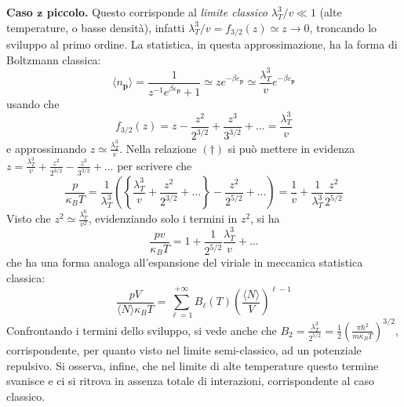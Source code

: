 \documentclass[11pt, a4paper]{scrartcl}
\theoremstyle{style}
\theoremstyle{style1}
\numberwithin{equation}{subsection}
\begin{document}
\textbf{Caso $\mathbf{z}$ piccolo.} Questo corrisponde al \textit{limite classico} $\lambda _T^3 / v \ll 1$ (alte temperature, o basse densit\`a), infatti $\lambda _T^3 / v=f_{3 / 2} (z) \simeq z \to 0$, troncando lo sviluppo al primo ordine.
La statistica, in questa approssimazione, ha la forma di Boltzmann classica:
\[
\langle n_\mathbf{p}  \rangle = \frac{1}{z^{-1}e^{\beta \varepsilon _\mathbf{p} }+1} \simeq z e^{-\beta \varepsilon _\mathbf{p} } \simeq \frac{\lambda _T^3}{v}e^{-\beta \varepsilon _\mathbf{p} }
\] 
usando che 
\begin{equation}
	f_{3 / 2} (z) = z - \frac{z^2}{2^{3 / 2}}+\frac{z^3}{3^{3 / 2}} + \ldots = \frac{\lambda _T^3}{v}
	\tag{$\dagger $}
\end{equation}
e approssimando $z\simeq \frac{\lambda _T^3}{v}$.
Nella relazione $(\dagger )$ si pu\`o mettere in evidenza $z = \frac{\lambda _T^3}{v} + \frac{z^2}{2^{3/2}} - \frac{z^3}{3^{3 / 2}}+\ldots$ per scrivere che
\[
\frac{p}{\kappa _B T} = \frac{1}{\lambda _T^3} \left(\left\{ \frac{\lambda _T^3}{v}+\frac{z^2}{2^{3 / 2}} + \ldots \right\} - \frac{z^2}{2^{5 / 2}}+ \ldots\right) = \frac{1}{v}+\frac{1}{\lambda _T^3} \frac{z^2}{2^{5 / 2}}
\] 
Visto che $z^2 \simeq \frac{\lambda _{T} ^6}{v^2}$, evidenziando solo i termini in $z^2$, si ha
\[
\frac{pv}{\kappa _B T} = 1 + \frac{1}{2^{5 / 2}}\frac{\lambda _T^3}{v} + \ldots 
\] 
che ha una forma analoga all'espansione del viriale in meccanica statistica classica:
\[
\frac{pV}{\langle N \rangle\kappa _B T } = \sum_{\ell =1}^{+\infty} B_\ell (T) \left(\frac{\langle N \rangle}{V}\right) ^{\ell -1}
\] 
Confrontando i termini dello sviluppo, si vede anche che $B_2 = \frac{\lambda _T^3}{2^{5 / 2}} = \frac{1}{2} \left(\frac{\pi \hbar ^2}{m\kappa _B T }\right) ^{3 / 2}$, corrispondente, per quanto visto nel limite semi-classico, ad un potenziale repulsivo.
Si osserva, infine, che nel limite di alte temperature questo termine svanisce e ci si ritrova in assenza totale di interazioni, corrispondente al caso classico.
\vspace{.5cm}
\end{document}
